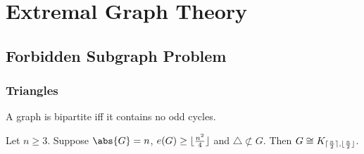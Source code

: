 \documentclass{article}
\DeclarePairedDelimiter\ceil{\lceil}{\rceil}
\DeclarePairedDelimiter\floor{\lfloor}{\rfloor}
\begin{document}










\clearpage
\section{Extremal Graph Theory}



























\subsection{Forbidden Subgraph Problem}














\subsubsection{Triangles}










\begin{nthm}\label{thm:7}
    A graph is bipartite iff it contains no odd cycles.
\end{nthm}












\begin{nthm}\label{thm:8}
    Let $n \geq 3$. Suppose $\abs{G} = n$, $e(G) \geq \floor{\frac{n^2}{4}}$ and $\triangle \not\subset G$.
    Then $G \cong K_{\ceil{\frac{n}{2}}, \floor{\frac{n}{2}}}$.
\end{nthm}
\end{document}
